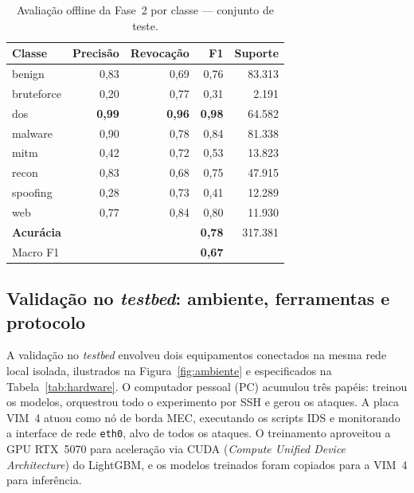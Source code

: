 \documentclass[12pt]{article}
\begin{document}
\begin{table}[ht]
\centering
\caption{Avaliação offline da Fase~2 por classe — conjunto de teste.}
\label{tab:phase2_offline}
\begin{tabular}{@{}lrrrr@{}}
\toprule
\textbf{Classe} & \textbf{Precisão} & \textbf{Revocação} & \textbf{F1} & \textbf{Suporte} \\ \midrule
benign      & 0,83 & 0,69 & 0,76 & 83.313 \\
bruteforce  & 0,20 & 0,77 & 0,31 &  2.191 \\
dos         & \textbf{0,99} & \textbf{0,96} & \textbf{0,98} & 64.582 \\
malware     & 0,90 & 0,78 & 0,84 & 81.338 \\
mitm        & 0,42 & 0,72 & 0,53 & 13.823 \\
recon       & 0,83 & 0,68 & 0,75 & 47.915 \\
spoofing    & 0,28 & 0,73 & 0,41 & 12.289 \\
web         & 0,77 & 0,84 & 0,80 & 11.930 \\ \midrule
\textbf{Acurácia} & & & \textbf{0,78} & 317.381 \\
Macro F1    & & & \textbf{0,67} & \\
\bottomrule
\end{tabular}
\end{table}

\subsection{Validação no \textit{testbed}: ambiente, ferramentas e protocolo}
\label{subsec:validacao}

A validação no \textit{testbed} envolveu dois equipamentos conectados na
mesma rede local isolada, ilustrados na Figura~\ref{fig:ambiente} e especificados
na Tabela~\ref{tab:hardware}. O computador pessoal (PC) acumulou três papéis:
treinou os modelos, orquestrou todo o experimento por SSH e gerou os ataques. A
placa VIM~4 atuou como nó de borda MEC, executando os scripts IDS e monitorando a
interface de rede \texttt{eth0}, alvo de todos os ataques. O treinamento aproveitou
a GPU RTX~5070 para aceleração via CUDA (\textit{Compute Unified Device
Architecture}) do LightGBM, e os modelos treinados foram copiados para a VIM~4 para
inferência.
\end{document}
